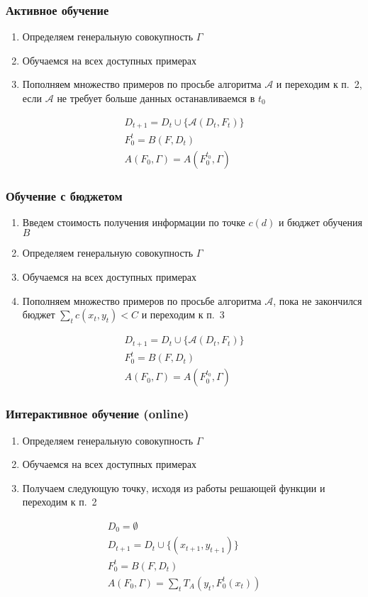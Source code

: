 \documentclass[14pt, fleqn, xcolor={dvipsnames, table}]{beamer}
\begin{document}
\begin{frame}
\frametitle{Активное обучение}
\begin{enumerate}
	\item Определяем генеральную совокупность $\Gamma$
	\item Обучаемся на всех доступных примерах
	\item Пополняем множество примеров по просьбе алгоритма $\mathcal{A}$ и переходим к п.~2, если $\mathcal{A}$ не требует больше данных останавливаемся в $t_0$
\end{enumerate}
$$\begin{array}{l}
D_{t+1} = D_{t} \cup \{\mathcal{A}(D_t, F_t)\} \\
F_0^t = B(F, D_{t}) \\
A(F_0, \Gamma) = A(F_0^{t_0}, \Gamma)
\end{array}$$
\end{frame}

\begin{frame}
\frametitle{Обучение с бюджетом}
\begin{enumerate}
	\item Введем стоимость получения информации по точке $c(d)$ и бюджет обучения $B$
	\item Определяем генеральную совокупность $\Gamma$
	\item Обучаемся на всех доступных примерах
	\item Пополняем множество примеров по просьбе алгоритма $\mathcal{A}$, пока не закончился бюджет $\sum_t c({x_t, y_t}) < C$ и переходим к п.~3
\end{enumerate}
$$\begin{array}{l}
D_{t+1} = D_{t} \cup \{\mathcal{A}(D_t, F_t)\} \\
F_0^t = B(F, D_{t}) \\
A(F_0, \Gamma) = A(F_0^{t_0}, \Gamma)
\end{array}$$
\end{frame}

\begin{frame}
\frametitle{Интерактивное обучение (online)}
\begin{enumerate}
	\item Определяем генеральную совокупность $\Gamma$
	\item Обучаемся на всех доступных примерах
	\item Получаем следующую точку, исходя из работы решающей функции и переходим к п.~2
\end{enumerate}
$$\begin{array}{l}
D_0 = \emptyset \\
D_{t+1} = D_{t} \cup \{(x_{t+1}, y_{t+1})\} \\
F_0^t = B(F, D_{t}) \\
A(F_0, \Gamma) = \sum_{t} T_A(y_t, F_0^t(x_t)) \\
\end{array}$$
\end{frame}
\end{document}
